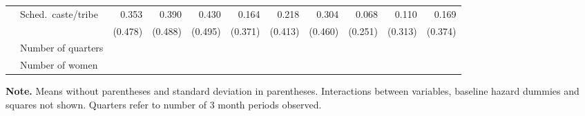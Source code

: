 \begin{table}[htp]
\begin{center}
\begin{scriptsize}
\begin{threeparttable}
\begin{tabular} {@{} c l D{.}{.}{1.3} D{.}{.}{1.3} D{.}{.}{1.3} D{.}{.}{1.3} D{.}{.}{1.3} D{.}{.}{1.3} D{.}{.}{1.3} D{.}{.}{1.3} D{.}{.}{1.3} @{}}
                    & Sched.\ caste/tribe &       0.353         &       0.390         &       0.430         &       0.164         &       0.218         &       0.304         &       0.068         &       0.110         &       0.169         \\
                    &                     &     (0.478)         &     (0.488)         &     (0.495)         &     (0.371)         &     (0.413)         &     (0.460)         &     (0.251)         &     (0.313)         &     (0.374)         \\
                    & Number of quarters  &  &  &  &  &  &  &  &  &  \\
                    & Number of women     &  &  &  &  &  &  &  &  &  \\
\bottomrule
\end{tabular}
\begin{tablenotes} \tiny
\item \hspace*{-0.7em} \textbf{Note.}
Means without parentheses and standard deviation in parentheses.
Interactions between variables, baseline hazard dummies and squares not shown.
Quarters refer to number of 3 month periods observed.
\end{tablenotes}
\end{threeparttable}
\end{scriptsize}
\end{center}
\end{table}

\addtocounter{table}{-1}

